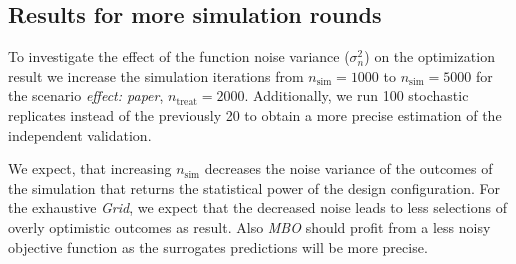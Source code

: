 \documentclass[bimj,fleqn]{w-art}
\theoremstyle{plain}
\theoremstyle{definition}
\begin{document}
\subsection{Results for more simulation rounds}

To investigate the effect of the function noise variance ($\sigma^2_n$) on the optimization result we increase the simulation iterations from $n_\text{sim} = 1000$ to $n_\text{sim} = 5000$ for the scenario \emph{effect: paper}, $n_{\text{treat}} = 2000$.
Additionally, we run 100 stochastic replicates instead of the previously 20 to obtain a more precise estimation of the independent validation.

We expect, that increasing $n_\text{sim}$ decreases the noise variance of the outcomes of the simulation that returns the statistical power of the design configuration.
For the exhaustive \emph{Grid}, we expect that the decreased noise leads to less selections of overly optimistic outcomes as result.
Also \emph{MBO} should profit from a less noisy objective function as the surrogates predictions will be more precise.
\end{document}
